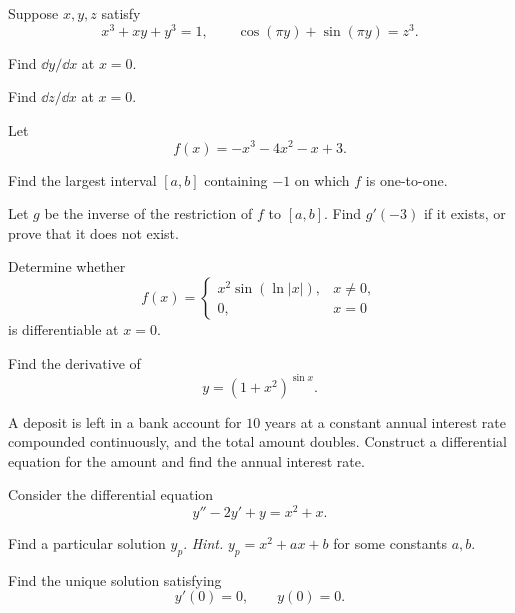 \begin{problem}
Suppose $x, y, z$ satisfy
\[
x^3+xy+y^3=1,
\qquad
\cos(\pi y)+\sin(\pi y)=z^3.
\]
\begin{problemsubparts}
\item Find $\dd y/\dd x$ at $x=0$.
\item Find $\dd z/\dd x$ at $x=0$.
\end{problemsubparts}
\end{problem}

\begin{problem}
Let
\[
f(x)=-x^3-4x^2-x+3.
\]
\begin{problemsubparts}
\item Find the largest interval $[a, b]$ containing $-1$ on which $f$ is one-to-one.
\item Let $g$ be the inverse of the restriction of $f$ to $[a, b]$. Find $g'(-3)$ if it exists, or prove that it does not exist.
\end{problemsubparts}
\end{problem}

\begin{problem}
\begin{problemsubparts}
\item Determine whether
\[
f(x)=
\begin{cases}
x^2\sin(\ln|x|), & x\ne0, \\
0, & x=0
\end{cases}
\]
is differentiable at $x=0$.
\item Find the derivative of
\[
y=(1+x^2)^{\sin x}.
\]
\end{problemsubparts}
\end{problem}

\begin{problem}
A deposit is left in a bank account for $10$ years at a constant annual interest rate compounded continuously, and the total amount doubles. Construct a differential equation for the amount and find the annual interest rate.
\end{problem}

\begin{problem}
Consider the differential equation
\[
y''-2y'+y=x^2+x.
\]
\begin{problemsubparts}
\item Find a particular solution $y_p$. \textit{Hint.} $y_p=x^2+ax+b$ for some constants $a, b$.
\item Find the unique solution satisfying
\[
y'(0)=0,
\qquad
y(0)=0.
\]
\end{problemsubparts}
\end{problem}

